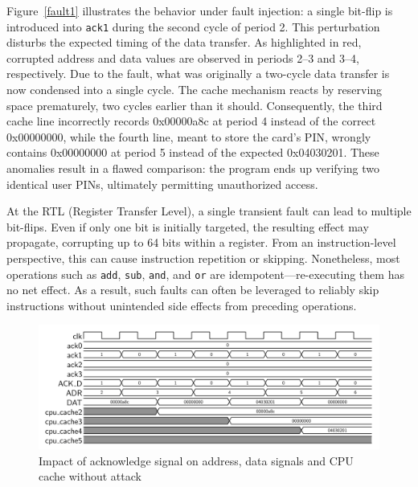 Figure~\ref{fault1} illustrates the behavior under fault injection: a single bit-flip is introduced into \texttt{ack1} during the second cycle of period 2. This perturbation disturbs the expected timing of the data transfer. As highlighted in red, corrupted address and data values are observed in periods 2–3 and 3–4, respectively. Due to the fault, what was originally a two-cycle data transfer is now condensed into a single cycle. The cache mechanism reacts by reserving space prematurely, two cycles earlier than it should. Consequently, the third cache line incorrectly records 0x00000a8c at period 4 instead of the correct 0x00000000, while the fourth line, meant to store the card’s PIN, wrongly contains 0x00000000 at period 5 instead of the expected 0x04030201. These anomalies result in a flawed comparison: the program ends up verifying two identical user PINs, ultimately permitting unauthorized access.

At the RTL (Register Transfer Level), a single transient fault can lead to multiple bit-flips. Even if only one bit is initially targeted, the resulting effect may propagate, corrupting up to 64 bits within a register. From an instruction-level perspective, this can cause instruction repetition or skipping. Nonetheless, most operations such as \texttt{add}, \texttt{sub}, \texttt{and}, and \texttt{or} are idempotent—re-executing them has no net effect. As a result, such faults can often be leveraged to reliably skip instructions without unintended side effects from preceding operations.

\begin{figure}[t!]
  \centering
  \includegraphics[width=\linewidth]{Chapitre4/figures/nofault1.png}
  \caption{Impact of acknowledge signal on address, data signals and CPU cache without attack}
  \label{nofault1}
\end{figure}

